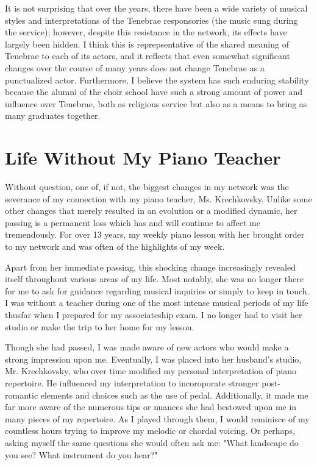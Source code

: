 \documentclass{article} %
\begin{document}
\begin{multicols}{2}
It is not surprising that over the years, there have been a wide variety of musical styles and interpretations of the Tenebrae responsories (the music sung during the service); however, despite this resistance in the network, its effects have largely been hidden.
I think this is reprepsentative of the shared meaning of Tenebrae to each of its actors, and it reflects that even somewhat significant changes over the course of many years does not change Tenebrae as a punctualized actor.
Furthermore, I believe the system has such enduring stability because the alumni of the choir school have such a strong amount of power and influence over Tenebrae, both as religious service but also as a means to bring as many graduates together.

\section{Life Without My Piano Teacher}

Without question, one of, if not, the biggest changes in my network was the severance of my connection with my piano teacher, Ms. Krechkovsky.
Unlike some other changes that merely resulted in an evolution or a modified dynamic, her passing is a permanent loss which has and will continue to affect me tremendously.
For over 13 years, my weekly piano lesson with her brought order to my network and was often of the highlights of my week.

Apart from her immediate passing, this shocking change increasingly revealed itself throughout various areas of my life.
Most notably, she was no longer there for me to ask for guidance regarding musical inquiries or simply to keep in touch.
I was without a teacher during one of the most intense musical periods of my life thusfar when I prepared for my associateship exam.
I no longer had to visit her studio or make the trip to her home for my lesson.

Though she had passed, I was made aware of new actors who would make a strong impression upon me.
Eventually, I was placed into her husband's studio, Mr. Krechkovsky, who over time modified my personal interpretation of piano repertoire.
He influenced my interpretation to incoroporate stronger post-romantic elements and choices such as the use of pedal.
Additionally, it made me far more aware of the numerous tips or nuances she had bestowed upon me in many pieces of my repertoire.
As I played through them, I would reminisce of my countless hours trying to improve my melodic or chordal voicing.
Or perhaps, asking myself the same questions she would often ask me: "What landscape do you see? What instrument do you hear?"


\end{multicols}
\end{document}
